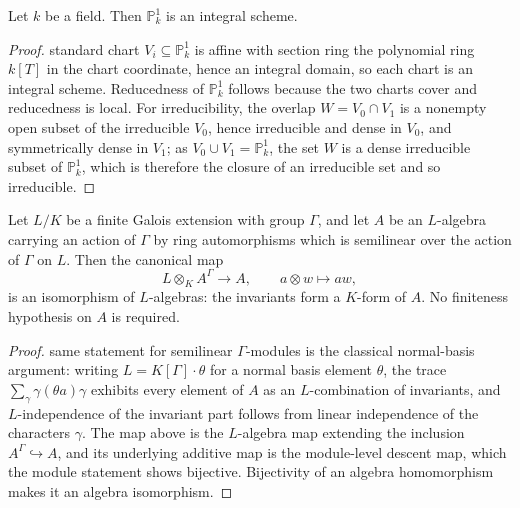 \begin{lemma}\label{mk-lem:p1_integral}
  \leanok

  Let \(k\) be a field. Then \(\mathbb{P}^1_k\) is an integral scheme.
\end{lemma}

\begin{proof}
  \leanokEach standard chart \(V_i \subseteq \mathbb{P}^1_k\) is affine with section
  ring the polynomial ring \(k[T]\) in the chart coordinate, hence an integral
  domain, so each chart is an integral scheme. Reducedness of \(\mathbb{P}^1_k\)
  follows because the two charts cover and reducedness is local. For
  irreducibility, the overlap \(W = V_0 \cap V_1\) is a nonempty open subset of
  the irreducible \(V_0\), hence irreducible and dense in \(V_0\), and
  symmetrically dense in \(V_1\); as \(V_0 \cup V_1 = \mathbb{P}^1_k\), the set
  \(W\) is a dense irreducible subset of \(\mathbb{P}^1_k\), which is therefore
  the closure of an irreducible set and so irreducible.
\end{proof}

\begin{theorem}\label{mk-thm:speiser_descent}
  \leanok

  Let \(L/K\) be a finite Galois extension with group \(\Gamma\), and let \(A\)
  be an \(L\)-algebra carrying an action of \(\Gamma\) by ring automorphisms
  which is semilinear over the action of \(\Gamma\) on \(L\). Then the canonical
  map
  \[
    L \otimes_K A^\Gamma \longrightarrow A, \qquad a \otimes w \mapsto a w,
  \]
  is an isomorphism of \(L\)-algebras: the invariants form a \(K\)-form of
  \(A\). No finiteness hypothesis on \(A\) is required.
\end{theorem}

\begin{proof}
  \leanokThe same statement for semilinear \(\Gamma\)-modules is the classical
  normal-basis argument: writing \(L = K[\Gamma] \cdot \theta\) for a normal
  basis element \(\theta\), the trace \(\sum_{\gamma} \gamma(\theta a) \gamma\)
  exhibits every element of \(A\) as an \(L\)-combination of invariants, and
  \(L\)-independence of the invariant part follows from linear independence of
  the characters \(\gamma\). The map above is the \(L\)-algebra map extending the
  inclusion \(A^\Gamma \hookrightarrow A\), and its underlying additive map is
  the module-level descent map, which the module statement shows bijective.
  Bijectivity of an algebra homomorphism makes it an algebra isomorphism.
\end{proof}

